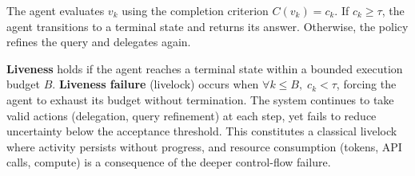 \documentclass[conference]{IEEEtran}
\begin{document}
The agent evaluates $v_k$ using the completion criterion $C(v_k) = c_k$. If $c_k \geq \tau$, the agent transitions to a terminal state and returns its answer. Otherwise, the policy refines the query and delegates again. 

\textbf{Liveness} holds if the agent reaches a terminal state within a bounded execution budget $B$. \textbf{Liveness failure} (livelock) occurs when $\forall k \leq B, \; c_k < \tau$, forcing the agent to exhaust its budget without termination. The system continues to take valid actions (delegation, query refinement) at each step, yet fails to reduce uncertainty below the acceptance threshold. This constitutes a classical livelock where activity persists without progress, and resource consumption (tokens, API calls, compute) is a consequence of the deeper control-flow failure.
\end{document}
